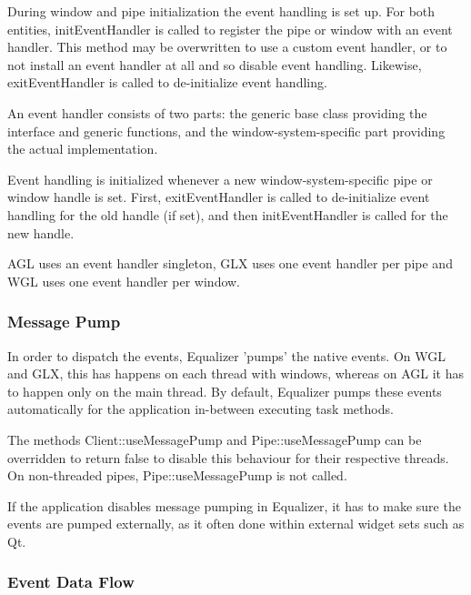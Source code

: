 \documentclass[10pt,a4]{scrartcl}
\begin{document}
During window and pipe initialization the event handling is set up. For
both entities, \textsf{initEvent\-Handler} is called to register the
pipe or window with an event handler. This method may be overwritten to
use a custom event handler, or to not install an event handler at all
and so disable event handling. Likewise, \textsf{exitEventHandler} is
called to de-initialize event handling.

An event handler consists of two parts: the generic base class providing
the interface and generic functions, and the window-system-specific
part providing the actual implementation. 

Event handling is initialized whenever a new window-system-specific
pipe or window handle is set. First, \textsf{exitEventHandler} is called
to de-initialize event handling for the old handle (if set), and then
\textsf{initEvent\-Handler} is called for the new handle. 

AGL uses an event handler singleton, GLX uses one event handler per pipe
and WGL uses one event handler per window.

\subsubsection{Message Pump}

In order to dispatch the events, Equalizer 'pumps' the native events. On
WGL and GLX, this has happens on each thread with windows, whereas on
AGL it has to happen only on the main thread. By default, Equalizer
pumps these events automatically for the application in-between
executing task methods.

The methods \textsf{Client::useMessagePump} and
\textsf{Pipe::useMessagePump} can be overridden to return \textsf{false}
to disable this behaviour for their respective threads. On non-threaded
pipes, \textsf{Pipe::useMessagePump} is not called.

If the application disables message pumping in Equalizer, it has to make
sure the events are pumped externally, as it often done within external
widget sets such as Qt.


\subsubsection{Event Data Flow}
\end{document}
